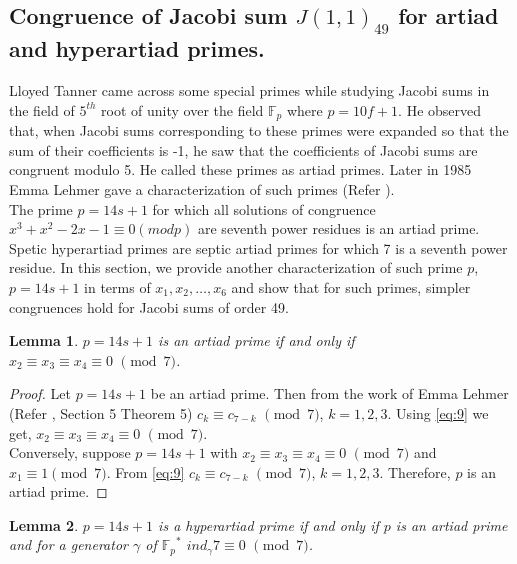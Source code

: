 \documentclass[a4paper,12pt]{article}
\newtheorem{lemma}{Lemma}[section]
\def\F{{\mathbb F}}
\def\vpmod{\!\!\!\pmod}
\begin{document}
\subsection{Congruence of Jacobi sum $J(1,1)_{49}$ for artiad and hyperartiad primes.}
 Lloyed Tanner came across some special primes while studying Jacobi sums in the field of $5^{th}$ root of unity over the field $\F_{p}$ where $p=10f+1$.
 He observed that, when Jacobi sums corresponding to these primes were expanded so that the sum of their coefficients is -1, he saw that the  coefficients of Jacobi sums are congruent modulo 5. He called these primes as artiad primes.
 Later in 1985 Emma Lehmer gave a characterization of such primes (Refer \cite{9}). \\
The prime $p=14s+1$ for which all solutions of congruence $x^{3}+x^{2}-2x-1\equiv 0(modp)$ are seventh power residues is an artiad prime. 
Spetic hyperartiad primes are septic artiad primes for which 7 is a seventh power residue.
 In this section, we provide another characterization of such prime $p$, $p=14s+1$ in terms of $x_{1}, x_{2},\ldots, x_{6}$ and 
 show that for such primes, simpler congruences hold for Jacobi sums of order 49.
\begin{lemma}\label{lem:lemma2}
 $p=14s+1$ is an artiad prime if and only if $x_{2}\equiv x_{3}\equiv x_{4}\equiv 0\,\,\vpmod 7$.
\end{lemma}
\begin{proof} Let $p=14s+1$ be an artiad prime. Then from the work of Emma Lehmer (Refer \cite{9}, Section 5 Theorem 5)
$c_{k}\equiv c_{7-k}\,\,\vpmod 7$, $k=1,2,3$. Using \eqref{eq:9} we get,
$x_{2}\equiv x_{3}\equiv x_{4}\equiv 0\,\,\vpmod 7$.\\
\hspace*{5mm} Conversely, suppose $p=14s+1$ with $x_{2}\equiv x_{3}\equiv x_{4}\equiv 0\,\,\vpmod 7$ and $x_{1}\equiv 1\vpmod 7$. From \eqref{eq:9} $c_{k}\equiv c_{7-k}\,\,\vpmod 7$, $k=1,2,3$.
Therefore, $p$ is an artiad prime.
\end{proof} 
\begin{lemma}\label{lem:lemma3}
$p=14s+1$ is a hyperartiad prime if and only if $p$ is an artiad prime and for a generator $\gamma$ of ${\F_{p}}^{*}$ $ind_{\gamma}7\equiv 0\,\,\vpmod 7$.
\end{lemma}
\end{document}
